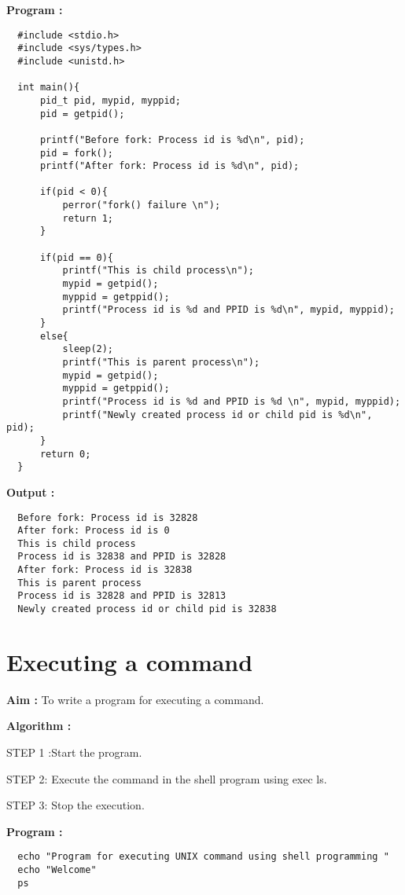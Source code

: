\documentclass[journal,onecolumn]{IEEEtran}
\begin{document}
\textbf{Program :}
\begin{verbatim}
  #include <stdio.h>
  #include <sys/types.h>
  #include <unistd.h>

  int main(){
      pid_t pid, mypid, myppid;
      pid = getpid();

      printf("Before fork: Process id is %d\n", pid);
      pid = fork();
      printf("After fork: Process id is %d\n", pid);

      if(pid < 0){
          perror("fork() failure \n");
          return 1;
      }
      
      if(pid == 0){
          printf("This is child process\n");
          mypid = getpid();
          myppid = getppid();
          printf("Process id is %d and PPID is %d\n", mypid, myppid);
      }
      else{
          sleep(2);
          printf("This is parent process\n");
          mypid = getpid();
          myppid = getppid();
          printf("Process id is %d and PPID is %d \n", mypid, myppid);
          printf("Newly created process id or child pid is %d\n", pid);
      }
      return 0;
  }
\end{verbatim}

\textbf{Output :}
\begin{verbatim}
  Before fork: Process id is 32828
  After fork: Process id is 0
  This is child process
  Process id is 32838 and PPID is 32828
  After fork: Process id is 32838
  This is parent process
  Process id is 32828 and PPID is 32813 
  Newly created process id or child pid is 32838
\end{verbatim}




\section{Executing a command}
\textbf{Aim : } To write a program for executing a command.

\textbf{Algorithm : }
\begin{list}{}{}
  \item STEP 1 :Start the program.
  \item STEP 2: Execute the command in the shell program using exec ls.
  \item STEP 3: Stop the execution.
\end{list}

\textbf{Program : }
\begin{verbatim}
  echo "Program for executing UNIX command using shell programming "
  echo "Welcome"
  ps
\end{verbatim}
\end{document}
